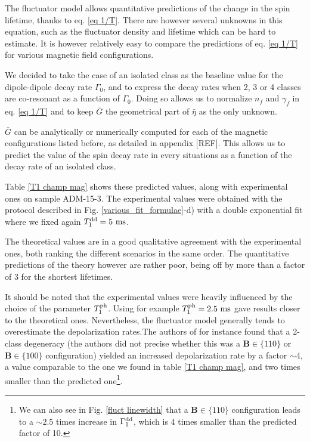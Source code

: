 \documentclass[a4paper,11pt]{report}
\begin{document}
The fluctuator model allows quantitative predictions of the change in the spin lifetime, thanks to eq. \ref{eq 1/T}. There are however several unknowns in this equation, such as the fluctuator density and lifetime which can be hard to estimate. It is however relatively easy to compare the predictions of eq. \ref{eq 1/T} for various magnetic field configurations.

We decided to take the case of an isolated class as the baseline value for the dipole-dipole decay rate $\Gamma_0$, and to express the decay rates when 2, 3 or 4 classes are co-resonant as a function of $\Gamma_0$. Doing so allows us to normalize $n_f$ and $\gamma_f$ in eq. \ref{eq 1/T} and to keep $\bar G$ the geometrical part of $\bar \eta$ as the only unknown.

$\bar G$ can be analytically or numerically computed for each of the magnetic configurations listed before, as detailed in appendix [REF]. This allows us to predict the value of the spin decay rate in every situations as a function of the decay rate of an isolated class.

Table \ref{T1 champ mag} shows these predicted values, along with experimental ones on sample ADM-15-3. The experimental values were obtained with the protocol described in Fig. \ref{various_fit_formulae}-d) with a double exponential fit where we fixed again $T_1^{\rm dd}=5\ \rm ms$.

The theoretical values are in a good qualitative agreement with the experimental ones, both ranking the different scenarios in the same order. The quantitative predictions of the theory however are rather poor, being off by more than a factor of 3 for the shortest lifetimes.

It should be noted that the experimental values were heavily influenced by the choice of the parameter $T_1^{\rm ph}$. Using for example $T_1^{\rm ph}=2.5\ \rm ms$ gave results closer to the theoretical ones. Nevertheless, the fluctuator model generally tends to overestimate the depolarization rates.The authors of \citep{choi2017depolarization} for instance found that a 2-class degeneracy (the authors did not precise whether this was a $\mathbf{B} \in \{110\}$ or $\mathbf{B} \in \{100\}$ configuration) yielded an increased depolarization rate by a factor $\sim 4$, a value comparable to the one we found in table \ref{T1 champ mag}, and two times smaller than the predicted one\footnote{We can also see in Fig. \ref{fluct linewidth} that a $\mathbf{B} \in \{110\}$ configuration leads to a $\sim 2.5$ times increase in $\Gamma_1^{\rm dd}$, which is 4 times smaller than the predicted factor of 10.}.
\end{document}
